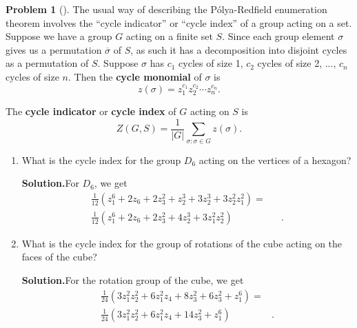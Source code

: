 \documentclass[10pt,]{book}
\newcommand{\terminology}[1]{\textbf{#1}}
\theoremstyle{plain}
\theoremstyle{definition}
\newtheorem{activity}[project]{Problem}
\theoremstyle{definition}
\numberwithin{equation}{chapter}
\newcommand{\amp}{&}
\begin{document}
\begin{activity}[]\label{activity-320}
The usual way of describing the Pólya-Redfield enumeration theorem involves the ``cycle indicator'' or ``cycle index'' of a group acting on a set. Suppose we have a group \(G\) acting on a finite set \(S\). Since each group element \(\sigma\) gives us a permutation \(\overline{\sigma}\) of \(S\), as such it has a decomposition into disjoint cycles as a permutation of \(S\). Suppose \(\sigma\) has \(c_1\) cycles of size 1, \(c_2\) cycles of size 2, ..., \(c_n\) cycles of size \(n\). Then the \terminology{cycle monomial} of \(\sigma\) is%
\begin{equation*}
z(\sigma) = z_1^{c_1}z_2^{c_2}\cdots z_n^{c_n}.
\end{equation*}
%
\par
The \terminology{cycle indicator} or \terminology{cycle index} of \(G\) acting on \(S\) is%
\begin{equation*}
Z(G,S) = \frac{1}{|G|}\sum_{\sigma: \sigma \in G} z(\sigma).
\end{equation*}
%
\begin{enumerate}[font=\bfseries,label=(\alph*),ref=\alph*]
\item\label{task-229} What is the cycle index for the group \(D_6\) acting on the vertices of a hexagon?%
\par\medskip\noindent%
\textbf{Solution.}\quad For \(D_6\), we get%
\begin{align*}
\frac{1}{12}\left(z_1^6
+2z_6+2z_3^2+z_2^3+3z_2^3+3z_2^2z_1^2\right)  =\amp\\
\frac{1}{12}\left(z_1^6
+2z_6+2z_3^2+4z_2^3+3z_1^2z_2^2\right)\amp \amp\text{.}
\end{align*}
%
\item\label{task-230} What is the cycle index for the group of rotations of the cube acting on the faces of the cube?%
\par\medskip\noindent%
\textbf{Solution.}\quad For the rotation group of the cube, we get%
\begin{align*}
\frac{1}{24}\left(3z_1^2z_2^2+ 6z_1^2z_4+8z_3^2 +6z_3^2+z_1^6\right) =\amp\\
\frac{1}{24}\left(3z_1^2z_2^2+ 6z_1^2z_4 +14z_3^2+z_1^6\right) \amp\text{.}
\end{align*}
%
\end{enumerate}
\end{activity}
\end{document}
